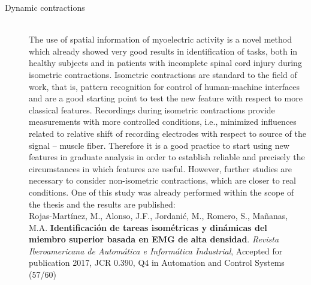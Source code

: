 \begin{description}
\item[Dynamic contractions] \hfill \\ 
	The use of spatial information of myoelectric activity is a novel method which already showed very good results in identification of tasks, both in healthy subjects and in patients with incomplete spinal cord injury during isometric contractions. Isometric contractions are standard to the field of work, that is, pattern recognition for control of human-machine interfaces and are a good starting point to test the new feature with respect to more classical features. Recordings during isometric contractions provide measurements with more controlled conditions, i.e., minimized influences related to relative shift of recording electrodes with respect to source of the signal – muscle fiber. Therefore it is a good practice to start using new features in graduate analysis in order to establish reliable and precisely the circumstances in which features are useful. However, further studies are necessary to consider non-isometric contractions, which are closer to real conditions. One of this study was already performed within the scope of the thesis and the results are published:\\
	\small{Rojas-Martínez, M., Alonso, J.F., Jordanić, M., Romero, S., Mañanas, M.A. \textbf{Identificación de tareas isométricas y dinámicas del miembro superior basada en EMG de alta densidad}. \textit{Revista Iberoamericana de Automática e Informática Industrial}, Accepted for publication 2017, JCR 0.390, Q4 in Automation and Control Systems (57/60)}
	
	
	


\end{description}
